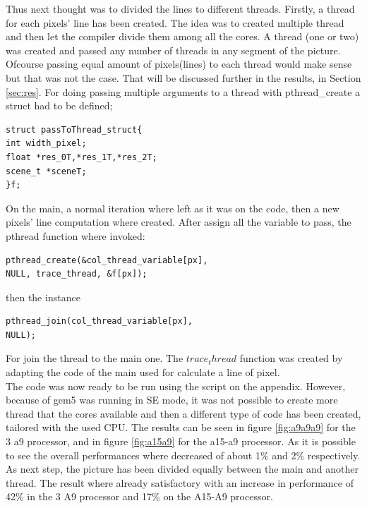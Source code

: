 \documentclass[journal]{IEEEtran}
\begin{document}
Thus next thought was to divided the lines to different threads. Firstly, a thread for each pixels’ line has been created. The idea was to created multiple thread and then let the compiler divide them among all the cores. A thread (one or two) was created and passed any number of threads in any segment of the picture. Ofcourse passing equal amount of pixels(lines) to each thread would make sense but that was not the case. That will be discussed further in the results, in Section \ref{sec:res}.
For doing passing multiple arguments to a thread with pthread\_create a struct had to be defined;
\begin{lstlisting}
struct passToThread_struct{
int width_pixel;
float *res_0T,*res_1T,*res_2T;
scene_t *sceneT;
}f;
\end{lstlisting}
On the main, a normal iteration where left as it was on the code, then a new pixels’ line computation where created. After assign all the variable to pass, the pthread function where invoked:
\begin{lstlisting}
pthread_create(&col_thread_variable[px],
NULL, trace_thread, &f[px]);
\end{lstlisting} 
then the instance 
\begin{lstlisting}
pthread_join(col_thread_variable[px], 
NULL);
\end{lstlisting}
For join the thread to the main one.
The \(trace_thread\) function was created by adapting the code of the main used for calculate a line of pixel.\\

The code was now ready to be run using the script on the appendix.
However, because of gem5 was running in SE mode, it was not possible to create more thread that the cores available and then a different type of code has been created, tailored with the used CPU.
The results can be seen in figure \ref{fig:a9a9a9} for the 3 a9 processor, and in figure \ref{fig:a15a9} for the a15-a9 processor. As it is possible to see the overall performances where decreased of about 1\% and 2\% respectively.
As next step, the picture has been divided equally between the main and another thread. The result where already satisfactory with an increase in performance of 42\% in the 3 A9 processor and 17\% on the A15-A9 processor.\\
\end{document}
